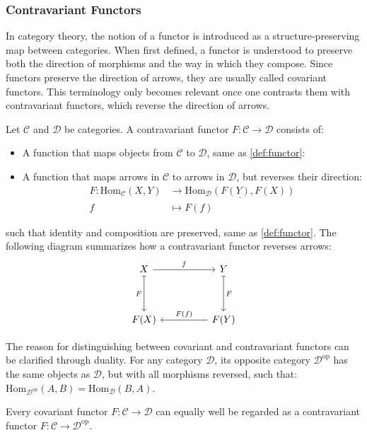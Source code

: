 \subsubsection{\centering Contravariant Functors}
In category theory, the notion of a functor is introduced as a structure-preserving map between categories. When first defined, a functor is understood to preserve both the direction of morphisms and the way in which they compose. Since functors preserve the direction of arrows, they are usually called covariant functors. This terminology only becomes relevant once one contrasts them with 
contravariant functors, which reverse the direction of arrows.
\begin{definition}
Let $\mathcal{C}$ and $\mathcal{D}$ be categories. A contravariant functor $F : \mathcal{C} \to \mathcal{D}$ consists of:
\begin{itemize}
  \item A function that maps objects from $\mathcal{C}$ to $\mathcal{D}$, same as \ref{def:functor}:
  \item A function that maps arrows in $\mathcal{C}$ to arrows in $\mathcal{D}$, 
        but reverses their direction:
    \[
      \begin{aligned}
        F : \mathrm{Hom}_{\mathcal{C}}(X,Y) &\longrightarrow \underline{\mathrm{Hom}_{\mathcal{D}}(F(Y),F(X))} \\
        f &\longmapsto F(f)
      \end{aligned}
    \]
\end{itemize}
such that identity and composition are preserved, same as \ref{def:functor}. The following diagram summarizes how a contravariant functor reverses arrows:
\[
  \begin{tikzcd}[row sep=huge, column sep=huge]
    X \arrow[r, "f"] \arrow[d, mapsto, "F"'] & Y \arrow[d, mapsto, "F"] \\
    F(X) & F(Y) \arrow[l, "F(f)"']
  \end{tikzcd}
\]
\end{definition}

The reason for distinguishing between covariant and contravariant functors can be clarified through duality. For any category $\mathcal{D}$, its opposite category $\mathcal{D}^{\mathrm{op}}$ 
has the same objects as $\mathcal{D}$, but with all morphisms reversed, such that:
\(
\mathrm{Hom}_{\mathcal{D}^{\mathrm{op}}}(A,B) = \mathrm{Hom}_{\mathcal{D}}(B,A).
\)
\begin{proposition}
Every covariant functor $F : \mathcal{C} \to \mathcal{D}$ can equally well be regarded as a contravariant functor
\(
F : \mathcal{C} \to \mathcal{D}^{\mathrm{op}}.
\)
\end{proposition}

